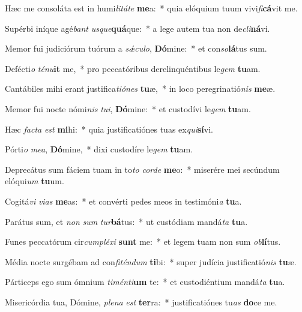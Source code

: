 \item Hæc me consoláta est in humi\textit{li}\textit{tá}\textit{te} \textbf{me}a:~* quia elóquium tuum vivi\textit{fi}\textbf{cá}vit me.
\item Supérbi iníque agé\textit{bant} \textit{us}\textit{que}\textbf{quá}que:~* a lege autem tua non de\textit{cli}\textbf{ná}vi.
\item Memor fui judiciórum tuórum a \textit{sǽ}\textit{cu}\textit{lo}, \textbf{Dó}mine:~* et con\textit{so}\textbf{lá}tus sum.
\item Defécti\textit{o} \textit{té}\textit{nu}\textbf{it} me,~* pro peccatóribus derelinquéntibus le\textit{gem} \textbf{tu}am.
\item Cantábiles mihi erant justifica\textit{ti}\textit{ó}\textit{nes} \textbf{tu}æ,~* in loco peregrinatió\textit{nis} \textbf{me}æ.
\item Memor fui nocte nómi\textit{nis} \textit{tu}\textit{i}, \textbf{Dó}mine:~* et custodívi le\textit{gem} \textbf{tu}am.
\item Hæc \textit{fac}\textit{ta} \textit{est} \textbf{mi}hi:~* quia justificatiónes tuas ex\textit{qui}\textbf{sí}vi.
\item Pórti\textit{o} \textit{me}\textit{a}, \textbf{Dó}mine,~* dixi custodíre le\textit{gem} \textbf{tu}am.
\item Deprecátus sum fáciem tuam in to\textit{to} \textit{cor}\textit{de} \textbf{me}o:~* miserére mei secúndum elóqui\textit{um} \textbf{tu}um.
\item Cogitá\textit{vi} \textit{vi}\textit{as} \textbf{me}as:~* et convérti pedes meos in testimóni\textit{a} \textbf{tu}a.
\item Parátus sum, et \textit{non} \textit{sum} \textit{tur}\textbf{bá}tus:~* ut custódiam mandá\textit{ta} \textbf{tu}a.
\item Funes peccatórum cir\textit{cum}\textit{plé}\textit{xi} \textbf{sunt} me:~* et legem tuam non sum \textit{ob}\textbf{lí}tus.
\item Média nocte surgébam ad con\textit{fi}\textit{tén}\textit{dum} \textbf{ti}bi:~* super judícia justificatió\textit{nis} \textbf{tu}æ.
\item Párticeps ego sum ómnium \textit{ti}\textit{mén}\textit{ti}\textbf{um} te:~* et custodiéntium mandá\textit{ta} \textbf{tu}a.
\item Misericórdia tua, Dómine, \textit{ple}\textit{na} \textit{est} \textbf{ter}ra:~* justificatiónes tu\textit{as} \textbf{do}ce me.
